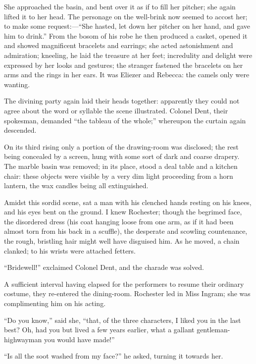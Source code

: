 She approached the basin, and bent over it as if to fill her pitcher;
she again lifted it to her head. The personage on the well-brink now
seemed to accost her; to make some request:---\enquote{She hasted, let
	down her pitcher on her hand, and gave him to drink.} From the bosom of
his robe he then produced a casket, opened it and showed magnificent
bracelets and earrings; she acted astonishment and admiration; kneeling,
he laid the treasure at her feet; incredulity and delight were expressed
by her looks and gestures; the stranger fastened the bracelets on her
arms and the rings in her ears. It was Eliezer and Rebecca: the camels
only were wanting.

The divining party again laid their heads together: apparently they
could not agree about the word or syllable the scene illustrated.
Colonel Dent, their spokesman, demanded \enquote{the tableau of the
	whole;} whereupon the curtain again descended.

On its third rising only a portion of the drawing-room was disclosed;
the rest being concealed by a screen, hung with some sort of dark and
coarse drapery. The marble basin was removed; in its place, stood a
deal table and a kitchen chair: these objects were visible by a very dim
light proceeding from a horn lantern, the wax candles being all
extinguished.

Amidst this sordid scene, sat a man with his clenched hands resting on
his knees, and his eyes bent on the ground. I knew \Mr{} Rochester;
though the begrimed face, the disordered dress (his coat hanging loose
from one arm, as if it had been almost torn from his back in a scuffle),
the desperate and scowling countenance, the rough, bristling hair might
well have disguised him. As he moved, a chain clanked; to his wrists
were attached fetters.

\enquote{Bridewell!} exclaimed Colonel Dent, and the charade was solved.

A sufficient interval having elapsed for the performers to resume their
ordinary costume, they re-entered the dining-room. \Mr{} Rochester led in
Miss Ingram; she was complimenting him on his acting.

\enquote{Do you know,} said she, \enquote{that, of the three characters,
	I liked you in the last best? Oh, had you but lived a few years
	earlier, what a gallant gentleman-highwayman you would have made!}

\enquote{Is all the soot washed from my face?} he asked, turning it
towards her.

